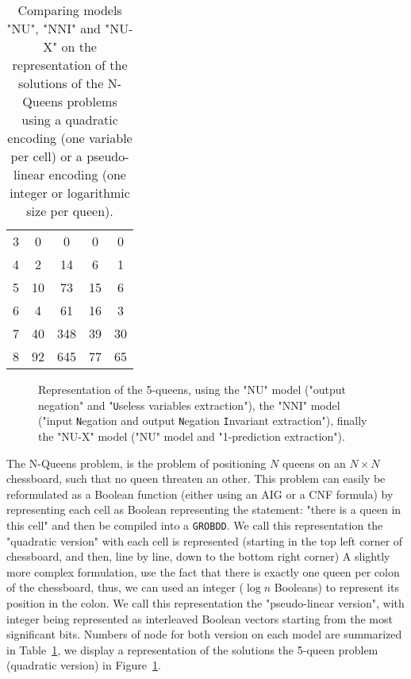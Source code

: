 \documentclass[a4paper,10pt]{article}
\newcommand{\includeframe}[4]{\makebox[#2\linewidth]{\texttt{[image: \#4]}}}
\newcommand{\Uextract}{"\texttt{U}seless variables extraction"}
\newcommand{\NNIextract}{"input \texttt{N}egation and output \texttt{N}egation \texttt{I}nvariant extraction"}
\newcommand{\Xextract}{"1-prediction extraction"}
\newcommand{\GroBdd}{\texttt{GROBDD}}
\begin{document}
\begin{table}[h]
\begin{tabular}{|c | c | c | c | c |}
3   & 0              & 0           & 0            & 0             \\
4   & 2              & 14          & 6            & 1             \\
5   & 10             & 73          & 15           & 6             \\
6   & 4              & 61          & 16           & 3             \\
7   & 40             & 348         & 39           & 30            \\
8   & 92             & 645         & 77           & 65            \\
\end{tabular}
\caption{Comparing models "NU", "NNI" and "NU-X" on the representation of the solutions of the N-Queens problems using a quadratic encoding (one variable per cell) or a pseudo-linear encoding (one integer or logarithmic size per queen).}
\label{table-nqueens}
\end{table}

\begin{figure}
\center
\includeframe{1}{0.9}{}{nqueens.pdf}
\caption{Representation of the 5-queens, using the "NU" model ("output negation" and \Uextract), the "NNI" model (\NNIextract), finally the "NU-X" model ("NU" model and \Xextract).}
\label{figure-nqueens}
\end{figure}

The N-Queens problem, is the problem of positioning $N$ queens on an $N\times N$ chessboard, such that no queen threaten an other.
This problem can easily be reformulated as a Boolean function (either using an AIG or a CNF formula) by representing each cell as Boolean representing the statement: "there is a queen in this cell" and then be compiled into a \GroBdd{}.
We call this representation the "quadratic version" with each cell is represented (starting in the top left corner of chessboard, and then, line by line, down to the bottom right corner)
A slightly more complex formulation, use the fact that there is exactly one queen per colon of the chessboard, thus, we can used an integer ($\log n$ Booleans) to represent its position in the colon.
We call this representation the "pseudo-linear version", with integer being represented as interleaved Boolean vectors starting from the most significant bits.
Numbers of node for both version on each model are summarized in Table~\ref{table-nqueens}, we display a representation of the solutions the 5-queen problem (quadratic version) in Figure~\ref{figure-nqueens}.
\end{document}
